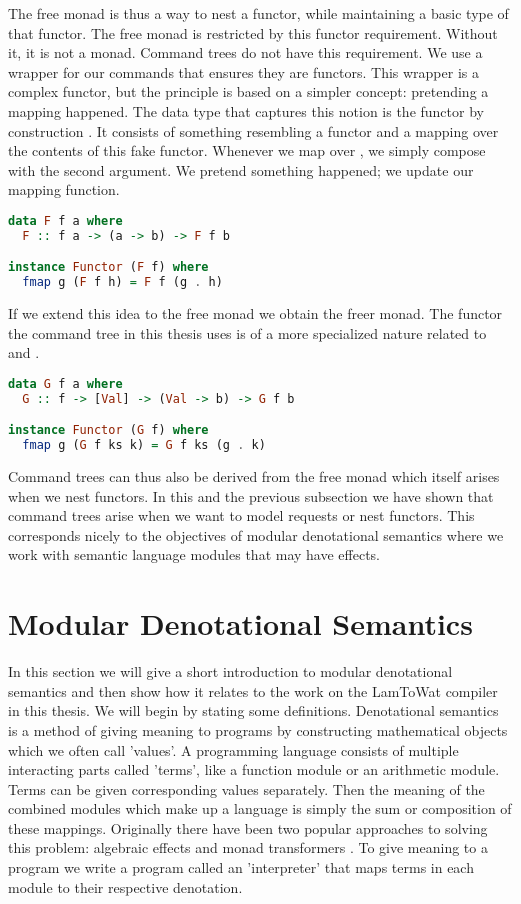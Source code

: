 The free monad is thus a way to nest a functor, while maintaining a basic type of that functor. The free monad is restricted by this functor requirement. Without it, it is not a monad. Command trees do not have this requirement. We use a wrapper for our commands that ensures they are functors. This wrapper is a complex functor, but the principle is based on a simpler concept: pretending a mapping happened. The data type that captures this notion is the functor by construction . It consists of something resembling a functor and a mapping over the contents of this fake functor. Whenever we map over , we simply compose with the second argument. We pretend something happened; we update our mapping function.

\begin{lstlisting}[language=Haskell]
data F f a where
  F :: f a -> (a -> b) -> F f b

instance Functor (F f) where
  fmap g (F f h) = F f (g . h)
\end{lstlisting}

If we extend this idea to the free monad we obtain the freer monad. The functor the command tree in this thesis uses is of a more specialized nature related to  and .

\begin{lstlisting}[language=Haskell]
data G f a where
  G :: f -> [Val] -> (Val -> b) -> G f b

instance Functor (G f) where
  fmap g (G f ks k) = G f ks (g . k)
\end{lstlisting}

Command trees can thus also be derived from the free monad which itself arises when we nest functors. In this and the previous subsection we have shown that command trees arise when we want to model requests or nest functors. This corresponds nicely to the objectives of modular denotational semantics where we work with semantic language modules that may have effects.

\section{\label{section:denotationalsemantics}Modular Denotational Semantics}
In this section we will give a short introduction to modular denotational semantics and then show how it relates to the work on the LamToWat compiler in this thesis. We will begin by stating some definitions. Denotational semantics is a method of giving meaning to programs by constructing mathematical objects which we often call 'values'. A programming language consists of multiple interacting parts called 'terms', like a function module or an arithmetic module. Terms can be given corresponding values separately. Then the meaning of the combined modules which make up a language is simply the sum or composition of these mappings. Originally there have been two popular approaches to solving this problem: algebraic effects \cite{DBLP:conf/tacs/CartwrightF94} and monad transformers \cite{DBLP:conf/popl/LiangHJ95}. To give meaning to a program we write a program called an 'interpreter' that maps terms in each module to their respective denotation.


